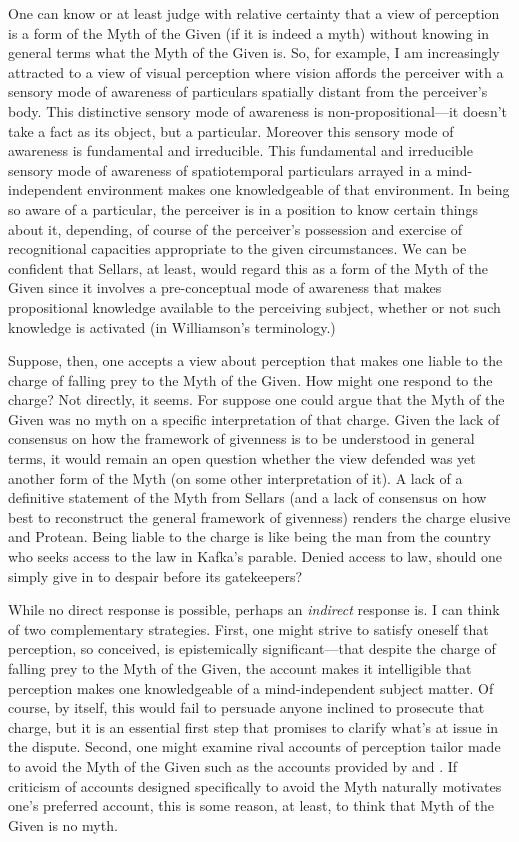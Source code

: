 \documentclass[12pt]{article}
\begin{document}
One can know or at least judge with relative certainty that a view of perception is a form of the Myth of the Given (if it is indeed a myth) without knowing in general terms what the Myth of the Given is. So, for example, I am increasingly attracted to a view of visual perception where vision affords the perceiver with a sensory mode of awareness of particulars spatially distant from the perceiver's body. This distinctive sensory mode of awareness is non-propositional---it doesn't take a fact as its object, but a particular. Moreover this sensory mode of awareness is fundamental and irreducible. This fundamental and irreducible sensory mode of awareness of spatiotemporal particulars arrayed in a mind-independent environment makes one knowledgeable of that environment. In being so aware of a particular, the perceiver is in a position to know certain things about it, depending, of course of the perceiver's possession and exercise of recognitional capacities appropriate to the given circumstances. We can be confident that Sellars, at least, would regard this as a form of the Myth of the Given since it involves a pre-conceptual mode of awareness that makes propositional knowledge available to the perceiving subject, whether or not such knowledge is activated (in Williamson's \citeyear{Williamson:1990uq} terminology.) 

Suppose, then, one accepts a view about perception that makes one liable to the charge of falling prey to the Myth of the Given. How might one respond to the charge? Not directly, it seems. For suppose one could argue that the Myth of the Given was no myth on a specific interpretation of that charge. Given the lack of consensus on how the framework of givenness is to be understood in general terms, it would remain an open question whether the view defended was yet another form of the Myth (on some other interpretation of it). A lack of a definitive statement of the Myth from Sellars (and a lack of consensus on how best to reconstruct the general framework of givenness) renders the charge elusive and Protean. Being liable to the charge is like being the man from the country who seeks access to the law in Kafka's parable. Denied access to law, should one simply give in to despair before its gatekeepers?

While no direct response is possible, perhaps an \emph{indirect} response is. I can think of two complementary strategies. First, one might strive to satisfy oneself that perception, so conceived, is epistemically significant---that despite the charge of falling prey to the Myth of the Given, the account makes it intelligible that perception makes one knowledgeable of a mind-independent subject matter. Of course, by itself, this would fail to persuade anyone inclined to prosecute that charge, but it is an essential first step that promises to clarify what's at issue in the dispute. Second, one might examine rival accounts of perception tailor made to avoid the Myth of the Given such as the accounts provided by \citet{Sellars:1956xp} and \citet{McDowell:1996uq}. If criticism of accounts designed specifically to avoid the Myth naturally motivates one's preferred account, this is some reason, at least, to think that Myth of the Given is no myth. 
\end{document}

